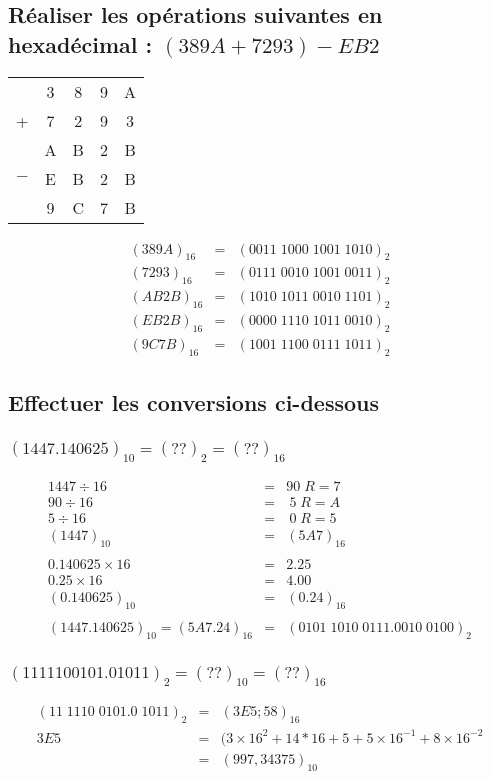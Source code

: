 \documentclass[12pt,a4paper,openany]{book}
\begin{document}
		\subsection{Réaliser les opérations suivantes en hexadécimal : $(389A+7293)-EB2$}
		\begin{center}
			
		\begin{tabular}{ccccc}
			&3&8&9&A\\
			+&7&2&9&3\\
			\hline
			&A&B&2&B\\
			$-$&E&B&2&B\\
			\hline
			&9&C&7&B
		\end{tabular}
		\begin{eqnarray*}
			(389A)_{16} &=& (0011\; 1000\; 1001\; 1010)_2\\
			(7293)_{16} &=& (0111\; 0010\; 1001\; 0011)_2\\
			(AB2B)_{16} &=& (1010\;1011\;0010\;1101)_2\\
			(EB2B)_{16} &=& (0000\;1110\;1011\;0010)_2\\
			(9C7B)_{16} &=& (1001\;1100\;0111\;1011)_2
		\end{eqnarray*}
		\end{center}

		\subsection{Effectuer les conversions ci-dessous}
			\subsubsection{$(1447.140625)_{10} = (??)_2 = (??)_{16}$}
			\begin{eqnarray*}
				1447\div 16 &=& 90\; R=7\\
				90 \div 16 &=&~5\; R=A\\
				5 \div 16 &=&  ~0 \; R=5\\ 
				(1447)_{10} &=& (5A7)_{16}\\\\
				0.140625 \times 16 &=& 2.25\\
				0.25 \times 16 &=& 4.00\\
				(0.140625)_{10} &=& (0.24)_{16}\\\\
				(1447.140625)_{10} = (5A7.24)_{16} &=& (0101\;1010\;0111.0010\;0100)_2
			\end{eqnarray*}
			\subsubsection{$(1111100101.01011)_{2} = (??)_{10} = (??)_{16}$}
			\begin{eqnarray*}
				(11\;1110\;0101.0\;1011)_2 &=& (3E5;58)_{16}\\
				3E5 &=& (3\times 16^2 + 14*16 + 5 + 5 \times 16^{-1} + 8 \times 16 ^{-2}\\
				&=& (997,34375)_{10}
			\end{eqnarray*}
\end{document}
